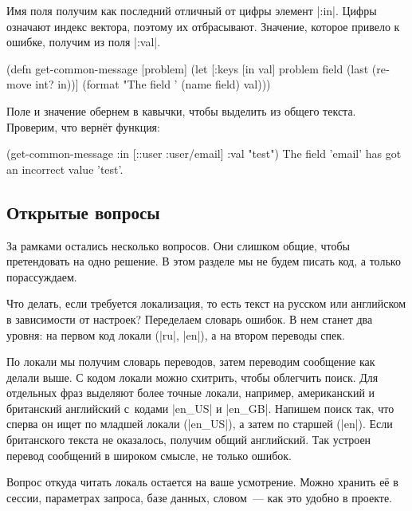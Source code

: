 Имя поля получим как последний отличный от цифры элемент \spverb|:in|. Цифры
означают индекс вектора, поэтому их отбрасывают. Значение, которое привело к
ошибке, получим из поля \spverb|:val|.

\begin{english}
  \begin{clojure}
(defn get-common-message [problem]
  (let [{:keys [in val]} problem
        field (last (remove int? in))]
    (format "The field '%
            (name field) val)))
  \end{clojure}
\end{english}

Поле и значение обернем в кавычки, чтобы выделить из общего текста. Проверим,
что верн\"{е}т функция:

\begin{english}
  \begin{clojure}
(get-common-message {:in [::user :user/email] :val "test"})
The field 'email' has got an incorrect value 'test'.
  \end{clojure}
\end{english}

\subsection{Открытые вопросы}

За рамками остались несколько вопросов. Они слишком общие, чтобы претендовать на
одно решение. В этом разделе мы не будем писать код, а только порассуждаем.

Что делать, если требуется локализация, то есть текст на русском или английском
в зависимости от настроек? Переделаем словарь ошибок. В нем станет два уровня:
на первом код локали (\spverb|ru|, \spverb|en|), а на втором переводы спек.


По локали мы получим словарь переводов, затем переводим сообщение как делали
выше. С кодом локали можно схитрить, чтобы облегчить поиск. Для отдельных фраз
выделяют более точные локали, например, американский и британский английский
с~кодами \spverb|en_US| и \spverb|en_GB|. Напишем поиск так, что сперва он ищет
по младшей локали (\spverb|en_US|), а затем по старшей (\spverb|en|). Если
британского текста не оказалось, получим общий английский. Так устроен перевод
сообщений в широком смысле, не только ошибок.

Вопрос откуда читать локаль остается на ваше усмотрение. Можно хранить е\"{е} в
сессии, параметрах запроса, базе данных, словом~--- как это удобно в проекте.

